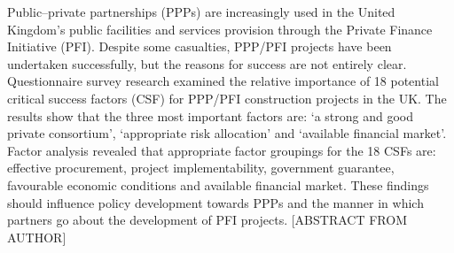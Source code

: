 Public–private partnerships (PPPs) are increasingly used in the United Kingdom's public facilities and services provision through the Private Finance Initiative (PFI). Despite some casualties, PPP/PFI projects have been undertaken successfully, but the reasons for success are not entirely clear. Questionnaire survey research examined the relative importance of 18 potential critical success
factors (CSF) for PPP/PFI construction projects in the UK. The results show that the three most important factors are: ‘a strong and good private consortium’, ‘appropriate risk allocation’ and ‘available
financial market’. Factor analysis revealed that appropriate factor groupings for the 18 CSFs are: effective procurement, project implementability, government guarantee, favourable economic conditions and
available financial market. These findings should influence policy development towards PPPs and the manner in which partners go about the development of PFI projects. [ABSTRACT FROM AUTHOR]